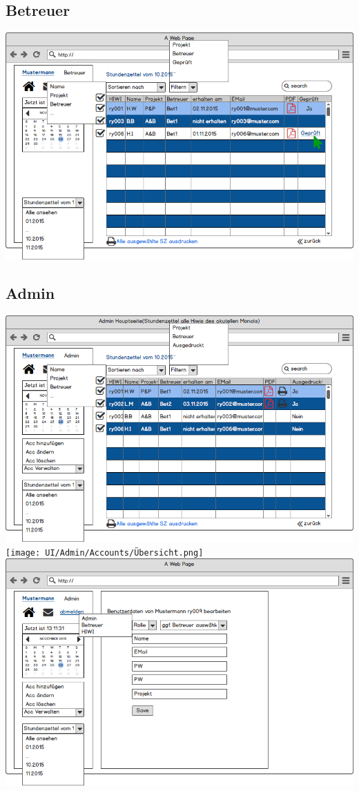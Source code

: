 \subsection{Betreuer}
\includegraphics[width=\linewidth]{UI/Betreuer/Hauptseite.png}

\subsection{Admin}
\includegraphics[width=\linewidth]{UI/Admin/Hauptseite.png}
\texttt{[image: UI/Admin/Accounts/Übersicht.png]}
\includegraphics[width=\linewidth]{UI/Admin/Accounts/Bearbeiten.png}
